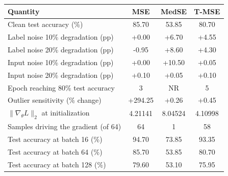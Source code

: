 \begin{tabular}{lccc}
\toprule
Quantity & MSE & MedSE & T-MSE \\
\midrule
Clean test accuracy (\%) & 85.70 & 53.85 & 80.70 \\
Label noise 10\% degradation (pp) & +0.00 & +6.70 & +4.55 \\
Label noise 20\% degradation (pp) & -0.95 & +8.60 & +4.30 \\
Input noise 10\% degradation (pp) & +0.00 & +10.50 & +0.05 \\
Input noise 20\% degradation (pp) & +0.10 & +0.05 & +0.10 \\
Epoch reaching 80\% test accuracy & 3 & NR & 5 \\
Outlier sensitivity (\% change) & +294.25 & +0.26 & +0.45 \\
$\|\nabla_\theta L\|_2$ at initialization & 4.21141 & 8.04524 & 4.10998 \\
Samples driving the gradient (of 64) & 64 & 1 & 58 \\
Test accuracy at batch 16 (\%) & 94.70 & 73.85 & 93.35 \\
Test accuracy at batch 64 (\%) & 85.70 & 53.85 & 80.70 \\
Test accuracy at batch 128 (\%) & 79.60 & 53.10 & 75.95 \\
\bottomrule
\end{tabular}